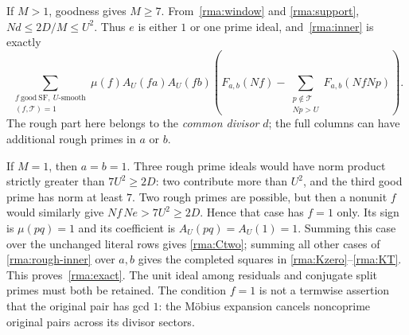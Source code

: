 \documentclass[11pt]{article}
\theoremstyle{definition}\newtheorem{definition}[theorem]{Definition}
\theoremstyle{remark}\newtheorem{remark}[theorem]{Remark}
\begin{document}
If $M>1$, goodness gives $M\ge7$. From~\eqref{rma:window} and
\eqref{rma:support}, $Nd\le2D/M\le U^2$. Thus $e$ is either $1$ or
one prime ideal, and~\eqref{rma:inner} is exactly
\begin{equation}\label{rma:rough-inner}
 \sum_{\substack{f\ \mathrm{good\ SF},\ U\text{-smooth}\\
                  (f,\mathcal T)=1}}
 \mu(f)A_U(fa)A_U(fb)
 \left(F_{a,b}(Nf)-
       \sum_{\substack{p\notin\mathcal T\\Np>U}}
                       F_{a,b}(NfNp)\right).
\end{equation}
The rough part here belongs to the \emph{common divisor} $d$; the full
columns can have additional rough primes in $a$ or $b$.

If $M=1$, then $a=b=1$. Three rough prime ideals would have norm product
strictly greater than $7U^2\ge2D$: two contribute more than $U^2$, and
the third good prime has norm at least $7$. Two rough primes are
possible, but then a nonunit $f$ would similarly give
$Nf\,Ne>7U^2\ge2D$. Hence that case has $f=1$ only. Its sign is
$\mu(pq)=1$ and its coefficient is $A_U(pq)=A_U(1)=1$.
Summing this case over the unchanged literal rows gives
\eqref{rma:Ctwo}; summing all other cases of
\eqref{rma:rough-inner} over $a,b$ gives the completed squares in
\eqref{rma:Kzero}--\eqref{rma:KT}. This proves~\eqref{rma:exact}.
The unit ideal among residuals and conjugate split primes must both be
retained. The condition $f=1$ is not a termwise assertion that the
original pair has gcd $1$: the M\"obius expansion cancels noncoprime
original pairs across its divisor sectors.
\end{document}
